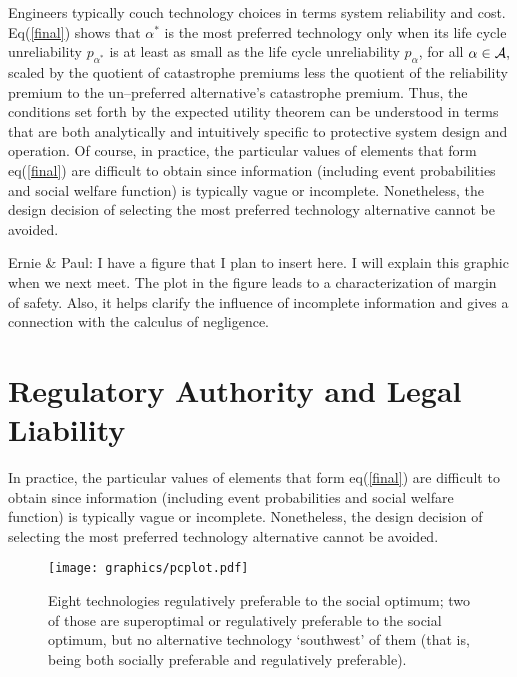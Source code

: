 \documentclass[12pt]{article}
\begin{document}
\noindent
Engineers typically couch technology choices in terms system reliability and cost.  Eq(\ref{final}) shows that $\alpha^*$ is the most preferred technology only when its life cycle unreliability $p_{\alpha^*}$ is at least as small as the life cycle unreliability $p_{\alpha}$, for all $\alpha \in {\cal{A}},$ scaled by the quotient of catastrophe premiums less the quotient of the reliability premium to the un--preferred alternative's catastrophe premium.  Thus, the conditions set forth by the expected utility theorem can be understood in terms that are both analytically and intuitively specific to protective system design and operation. Of course, in practice, the particular values of elements that form eq(\ref{final}) are difficult to obtain since information (including event probabilities and social welfare function) is typically vague or incomplete. Nonetheless, the design decision of selecting the most preferred technology alternative cannot be avoided.


{\color{red}Ernie \& Paul:  I have a figure that I plan to insert here.  I will explain this graphic when we next meet.  The plot in the figure  leads to a characterization of margin of safety. Also, it helps clarify the influence of incomplete information and gives a connection with the calculus of negligence.}

\section{Regulatory Authority and Legal Liability}
In practice, the particular values of elements that form eq(\ref{final}) are difficult to obtain since information (including event probabilities and social welfare function) is typically vague or incomplete. Nonetheless, the design decision of selecting the most preferred technology alternative cannot be avoided.

\begin{figure}[ht]
\centering
	\texttt{[image: graphics/pcplot.pdf]}
\caption{Eight technologies regulatively preferable to the social optimum; two of those are superoptimal or regulatively preferable to the social optimum, but no alternative technology `southwest' of them (that is, being both socially preferable and regulatively preferable).}
\label{fig:point_slope}
\end{figure}





\end{document}
